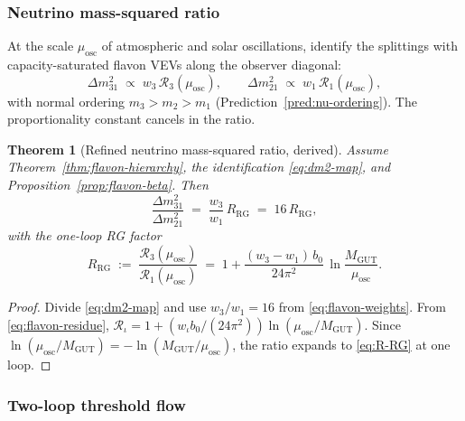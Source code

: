 \documentclass[aps,prd,onecolumn,amsmath,amssymb,nofootinbib,11pt]{revtex4-2}
\numberwithin{equation}{section}
\theoremstyle{plain}
\newtheorem{theorem}{Theorem}[section]
\theoremstyle{definition}
\theoremstyle{remark}
\begin{document}
\subsubsection{Neutrino mass-squared ratio}

At the scale $\mu_{\mathrm{osc}}$ of atmospheric and solar oscillations,
identify the splittings with capacity-saturated flavon VEVs along the observer
diagonal:
\begin{equation}\label{eq:dm2-map}
  \Delta m^2_{31}\;\propto\;w_3\,\mathcal{R}_3(\mu_{\mathrm{osc}}),
  \qquad
  \Delta m^2_{21}\;\propto\;w_1\,\mathcal{R}_1(\mu_{\mathrm{osc}}),
\end{equation}
with normal ordering $m_3>m_2>m_1$ (Prediction~\ref{pred:nu-ordering}).
The proportionality constant cancels in the ratio.

\begin{theorem}[Refined neutrino mass-squared ratio, derived]
\label{thm:nu-ratio-rg}
Assume Theorem~\ref{thm:flavon-hierarchy}, the identification \eqref{eq:dm2-map},
and Proposition~\ref{prop:flavon-beta}. Then
\begin{equation}\label{eq:nu-ratio-refined}
  \frac{\Delta m^2_{31}}{\Delta m^2_{21}}
  \;=\;
  \frac{w_3}{w_1}\,R_{\mathrm{RG}}
  \;=\;
  16\,R_{\mathrm{RG}},
\end{equation}
with the one-loop RG factor
\begin{equation}\label{eq:R-RG}
  R_{\mathrm{RG}}
  \;:=\;
  \frac{\mathcal{R}_3(\mu_{\mathrm{osc}})}{\mathcal{R}_1(\mu_{\mathrm{osc}})}
  \;=\;
  1 + \frac{(w_3-w_1)\,b_0}{24\pi^2}\,
  \ln\!\frac{M_{\mathrm{GUT}}}{\mu_{\mathrm{osc}}}.
\end{equation}
\end{theorem}

\begin{proof}
Divide \eqref{eq:dm2-map} and use $w_3/w_1=16$ from \eqref{eq:flavon-weights}.
From \eqref{eq:flavon-residue},
$\mathcal{R}_\iota=1+(w_\iota b_0/(24\pi^2))\ln(\mu_{\mathrm{osc}}/M_{\mathrm{GUT}})$.
Since $\ln(\mu_{\mathrm{osc}}/M_{\mathrm{GUT}})=
-\ln(M_{\mathrm{GUT}}/\mu_{\mathrm{osc}})$, the ratio expands to
\eqref{eq:R-RG} at one loop.
\end{proof}

\subsubsection{Two-loop threshold flow}
\end{document}
